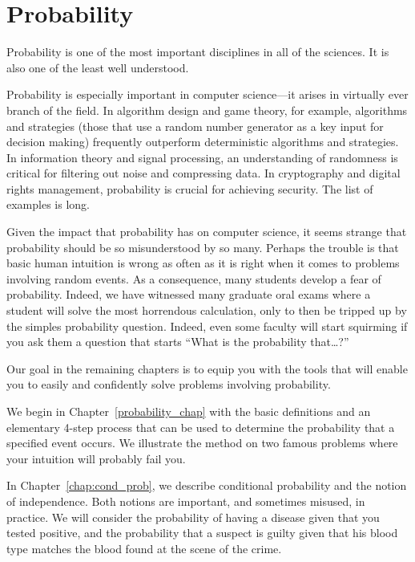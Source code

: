 \part{Probability}
\label{part:probability}

\partintro

Probability is one of the most important disciplines in all of the
sciences.  It is also one of the least well understood.

Probability is especially important in computer science---it arises in
virtually ever branch of the field.  In algorithm design and game
theory, for example,  algorithms and strategies
(those that use a random number generator as a key input for decision
making) frequently outperform deterministic algorithms and
strategies.  In information theory and signal processing, an
understanding of randomness is critical for filtering out noise and
compressing data.  In cryptography and digital rights management,
probability is crucial for achieving security.  The list of examples
is long.

Given the impact that probability has on computer science, it seems
strange that probability should be so misunderstood by so many.
Perhaps the trouble is that basic human intuition is wrong as often as
it is right when it comes to problems involving random events.  As a
consequence, many students develop a fear of probability.  Indeed, we
have witnessed many graduate oral exams where a student will solve the
most horrendous calculation, only to then be tripped up by the simples
probability question.  Indeed, even some faculty will start squirming
if you ask them a question that starts ``What is the probability
that\dots?''

Our goal in the remaining chapters is to equip you with the tools that
will enable you to easily and confidently solve problems involving
probability.

We begin in Chapter~\ref{probability_chap} with the basic definitions
and an elementary 4-step process that can be used to determine the
probability that a specified event occurs.  We illustrate the method
on two famous problems where your intuition will probably fail you.

In Chapter~\ref{chap:cond_prob}, we describe conditional probability and
the notion of independence.  Both notions are important, and sometimes
misused, in practice.  We will consider the probability of having a
disease given that you tested positive, and the probability that a
suspect is guilty given that his blood type matches the blood found at
the scene of the crime.

